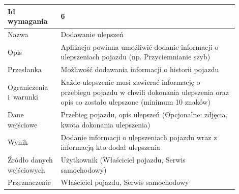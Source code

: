 \documentclass[12pt]{article}
\begin{document}
\begin{table}[H]
\begin{center}
	\begin{tabular}{|p{0.18\linewidth}|p{0.72\linewidth}|}%
	\hline
	Id wymagania 	& 6 				\\ \hline
	Nazwa			& Dodawanie ulepszeń
 \\ \hline
	Opis &
	
	Aplikacja powinna umożliwić dodanie informacji o ulepszeniach pojazdu (np. Przyciemnianie szyb)

\\ \hline
	Przesłanka & 

Możliwość dodawania informacji o historii pojazdu

  \\ \hline
	Ograniczenia i~warunki & 

Każde ulepszenie musi zawierać informację o przebiegu pojazdu w chwili dokonania ulepszenia oraz opis co zostało ulepszone (minimum 10 znaków)

 \\ \hline
	Dane wejściowe &

Przebieg pojazdu, opis ulepszeń
(Opcjonalne: zdjęcia, kwota dokonania ulepszenia)

 \\ \hline
	Wynik & 

Dodanie informacji o ulepszeniach pojazdu wraz z informacją kto dodał ulepszenia

\\ \hline
	Źródło danych wejściowych &
	
Użytkownik (Właściciel pojazdu, Serwis samochodowy)

\\ \hline

	Przeznaczenie & 
	
Właściciel pojazdu, Serwis samochodowy

\\ \hline
	\end{tabular}

\end{center}
\end{table}
\end{document}
